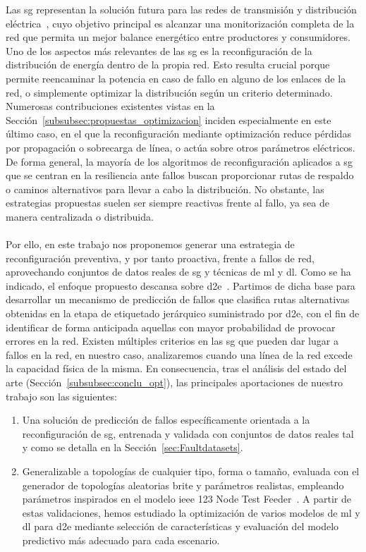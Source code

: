 Las \gls{sg} representan la solución futura para las redes de transmisión y distribución eléctrica~\cite{Vu1997,Amin2005}, cuyo objetivo principal es alcanzar una monitorización completa de la red que permita un mejor balance energético entre productores y consumidores. Uno de los aspectos más relevantes de las \gls{sg} es la reconfiguración de la distribución de energía dentro de la propia red. Esto resulta crucial porque permite reencaminar la potencia en caso de fallo en alguno de los enlaces de la red, o simplemente optimizar la distribución según un criterio determinado. Numerosas contribuciones existentes vistas en la Sección~\ref{subsubsec:propuestas_optimizacion} inciden especialmente en este último caso, en el que la reconfiguración mediante optimización reduce pérdidas por propagación o sobrecarga de línea, o actúa sobre otros parámetros eléctricos. De forma general, la mayoría de los algoritmos de reconfiguración aplicados a \gls{sg} que se centran en la resiliencia ante fallos buscan proporcionar rutas de respaldo o caminos alternativos para llevar a cabo la distribución. No obstante, las estrategias propuestas suelen ser siempre reactivas frente al fallo, ya sea de manera centralizada o distribuida.\\
\\
Por ello, en este trabajo nos proponemos generar una estrategia de reconfiguración preventiva, y por tanto proactiva, frente a fallos de red, aprovechando conjuntos de datos reales de \gls{sg} y técnicas de \gls{ml} y \gls{dl}. Como se ha indicado, el enfoque propuesto descansa sobre \gls{d2e}~\cite{carrascal2024topology}. Partimos de dicha base para desarrollar un mecanismo de predicción de fallos que clasifica rutas alternativas obtenidas en la etapa de etiquetado jerárquico suministrado por \gls{d2e}, con el fin de identificar de forma anticipada aquellas con mayor probabilidad de provocar errores en la red. Existen múltiples criterios en las \gls{sg} que pueden dar lugar a fallos en la red, en nuestro caso, analizaremos cuando una línea de la red excede la capacidad física de la misma. En consecuencia, tras el análisis del estado del arte (Sección~\ref{subsubsec:conclu_opt}), las principales aportaciones de nuestro trabajo son las siguientes:

\begin{enumerate}
    \item Una solución de predicción de fallos específicamente orientada a la reconfiguración de \gls{sg}, entrenada y validada con conjuntos de datos reales tal y como se detalla en la Sección~\ref{sec:Faultdatasets}.

    \item Generalizable a topologías de cualquier tipo, forma o tamaño, evaluada con el generador de topologías aleatorias \gls{brite} y parámetros realistas, empleando parámetros inspirados en el modelo \gls{ieee} 123 Node Test Feeder~\cite{Schneider17}. A partir de estas validaciones, hemos estudiado la optimización de varios modelos de \gls{ml} y \gls{dl} para \gls{d2e} mediante selección de características y evaluación del modelo predictivo más adecuado para cada escenario.
\end{enumerate}

